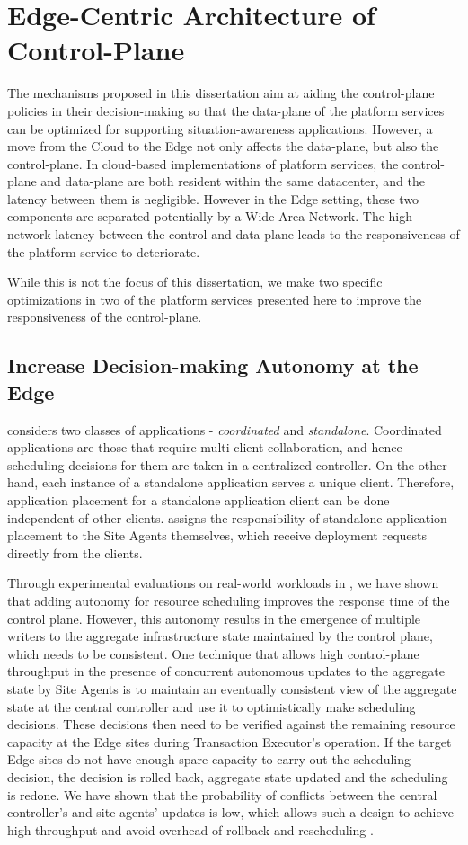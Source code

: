 \section{Edge-Centric Architecture of Control-Plane}

The mechanisms proposed in this dissertation aim at aiding the control-plane policies in their decision-making so that the data-plane of the platform services can be optimized for supporting situation-awareness applications. However, a move from the Cloud to the Edge not only affects the data-plane, but also the control-plane. In cloud-based implementations of platform services, the control-plane and data-plane are both resident within the same datacenter, and the latency between them is negligible. However in the Edge setting, these two components are separated potentially by a Wide Area Network. The high network latency between the control and data plane leads to the responsiveness of the platform service to deteriorate.
\par While this is not the focus of this dissertation, we make two specific optimizations in two of the platform services presented here to improve the responsiveness of the control-plane. 

\subsection{Increase Decision-making Autonomy at the Edge}
\oneedge{} considers two classes of applications - \textit{coordinated} and \textit{standalone}. Coordinated applications are those that require multi-client collaboration, and hence scheduling decisions for them are taken in a centralized controller. On the other hand, each instance of a standalone application serves a unique client. Therefore, application placement for a standalone application client can be done independent of other clients. \oneedge{} assigns the responsibility of standalone application placement to the Site Agents themselves, which receive deployment requests directly from the clients. 
\par Through experimental evaluations on real-world workloads in \cite{oneedge}, we have shown that adding autonomy for resource scheduling improves the response time of the control plane. However, this autonomy results in the emergence of multiple writers to the aggregate infrastructure state maintained by the control plane, which needs to be consistent. One technique that allows high control-plane throughput in the presence of concurrent autonomous updates to the aggregate state by Site Agents is to maintain an eventually consistent view of the aggregate state at the central controller and use it to optimistically make scheduling decisions. These decisions then need to be verified against the remaining resource capacity at the Edge sites during Transaction Executor's operation. If the target Edge sites do not have enough spare capacity to carry out the scheduling decision, the decision is rolled back, aggregate state updated and the scheduling is redone. We have shown that the probability of conflicts between the central controller's and site agents' updates is low, which allows such a design to achieve high throughput and avoid overhead of rollback and rescheduling \cite{oneedge}.

